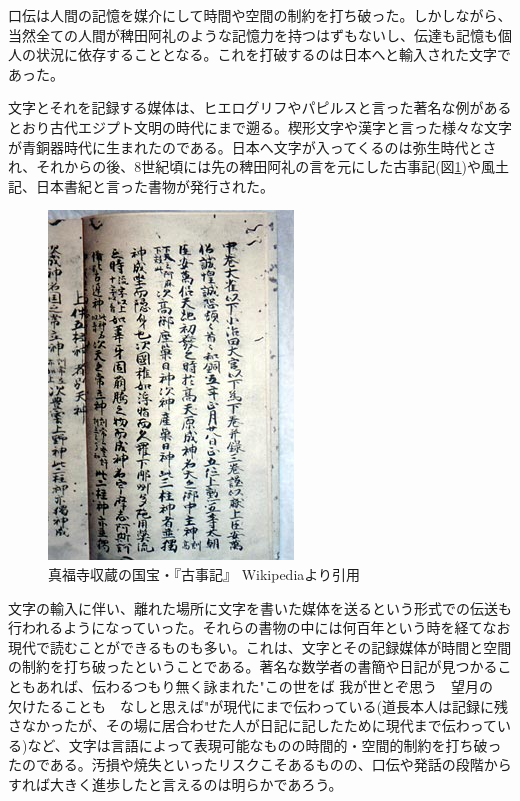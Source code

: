 口伝は人間の記憶を媒介にして時間や空間の制約を打ち破った。しかしながら、当然全ての人間が稗田阿礼のような記憶力を持つはずもないし、伝達も記憶も個人の状況に依存することとなる。これを打破するのは日本へと輸入された文字であった。

文字とそれを記録する媒体は、ヒエログリフやパピルスと言った著名な例があるとおり古代エジプト文明の時代にまで遡る。楔形文字や漢字と言った様々な文字が青銅器時代に生まれたのである。日本へ文字が入ってくるのは弥生時代とされ、それからの後、8世紀頃には先の稗田阿礼の言を元にした古事記(図\ref{fig0_2})や風土記、日本書紀と言った書物が発行された。

\begin{figure}[htbp]
\centering
\includegraphics[width=0.6\linewidth,keepaspectratio,bb=0 0 246 350]{fig/fig0_2.jpg}
\caption{真福寺収蔵の国宝・『古事記』 Wikipediaより引用}\label{fig0_2}
\end{figure}

文字の輸入に伴い、離れた場所に文字を書いた媒体を送るという形式での伝送も行われるようになっていった。それらの書物の中には何百年という時を経てなお現代で読むことができるものも多い。これは、文字とその記録媒体が時間と空間の制約を打ち破ったということである。著名な数学者の書簡や日記が見つかることもあれば、伝わるつもり無く詠まれた"この世をば 我が世とぞ思う　望月の　欠けたることも　なしと思えば"が現代にまで伝わっている(道長本人は記録に残さなかったが、その場に居合わせた人が日記に記したために現代まで伝わっている)など、文字は言語によって表現可能なものの時間的・空間的制約を打ち破ったのである。汚損や焼失といったリスクこそあるものの、口伝や発話の段階からすれば大きく進歩したと言えるのは明らかであろう。

